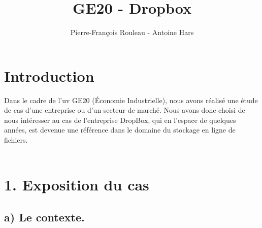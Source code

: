 \documentclass[a4paper, 10pt]{article}
\title{GE20 - Dropbox}
\author{Pierre-François Rouleau - Antoine Hars}
\begin{document}
\maketitle

\section*{Introduction}
\indent

Dans le cadre de l'uv GE20 (Économie Industrielle),
nous avons réalisé une étude de cas d'une entreprise ou d'un secteur de marché.
Nous avons donc choisi de nous intéresser au cas de l'entreprise DropBox,
qui en l'espace de quelques années, est devenue une référence dans le domaine du stockage en ligne de fichiers.\\ \\

\section*{1. Exposition du cas}

\subsection*{a) Le contexte.}
\indent
\end{document}
